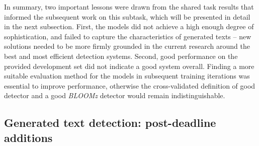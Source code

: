 In summary, two important lessons were drawn from the shared task results that informed the subsequent work on this subtask, which will be presented in detail in the next subsection.
First, the models did not achieve a high enough degree of sophistication, and failed to capture the characteristics of generated texts -- new solutions needed to be more firmly grounded in the current research around the best and most efficient detection systems.
Second, good performance on the provided development set did not indicate a good system overall.
Finding a more suitable evaluation method for the models in subsequent training iterations was essential to improve performance, otherwise the cross-validated definition of good detector and a good \emph{BLOOMz} detector would remain indistinguishable.

\subsection{Generated text detection: post-deadline additions}